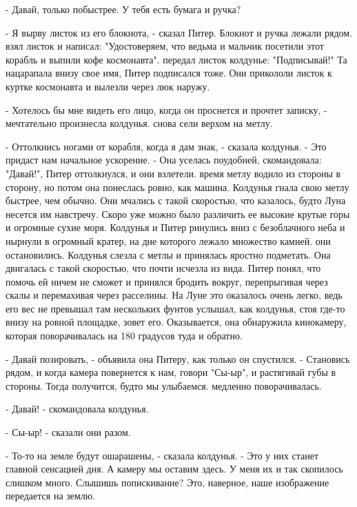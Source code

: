 \par- Давай, только побыстрее. У тебя есть бумага и ручка?
\par- Я вырву листок из его блокнота, - сказал Питер. Блокнот и ручка 
лежали рядом.
 взял листок и написал: "Удостоверяем, что ведьма и мальчик 
посетили этот корабль и выпили кофе космонавта".
 передал листок колдунье: "Подписывай!" Та нацарапала внизу свое 
имя, Питер подписался тоже. Они прикололи листок к куртке космонавта и 
вылезли через люк наружу.
\par- Хотелось бы мне видеть его лицо, когда он проснется и прочтет 
записку, - мечтательно произнесла колдунья.
 снова сели верхом на метлу.
\par- Оттолкнись ногами от корабля, когда я дам знак, - сказала 
колдунья. - Это придаст нам начальное ускорение. - Она уселась 
поудобней, скомандовала: "Давай!", Питер оттолкнулся, и они взлетели.
 время метлу водило из стороны в сторону, но потом она 
понеслась ровно, как машина. Колдунья гнала свою метлу быстрее, чем 
обычно. Они мчались с такой скоростью, что казалось, будто Луна 
несется им навстречу. Скоро уже можно было различить ее высокие крутые 
горы и огромные сухие моря. Колдунья и Питер ринулись вниз с 
безоблачного неба и нырнули в огромный кратер, на дне которого лежало 
множество камней.
 они остановились. Колдунья слезла с метлы и принялась яростно 
подметать. Она двигалась с такой скоростью, что почти исчезла из вида. 
Питер понял, что помочь ей ничем не сможет и принялся бродить вокруг, 
перепрыгивая через скалы и перемахивая через расселины. На Луне это 
оказалось очень легко, ведь его вес не превышал там нескольких фунтов
 услышал, как колдунья, стоя где-то внизу на ровной площадке, 
зовет его. Оказывается, она обнаружила кинокамеру, которая 
поворачивалась на 180 градусов туда и обратно.
\par- Давай позировать, - объявила она Питеру, как только он 
спустился. - Становись рядом, и когда камера повернется к нам, говори 
"Сы-ыр", и растягивай губы в стороны. Тогда получится, будто мы 
улыбаемся.
 медленно поворачивалась.
\par- Давай! - скомандовала колдунья.
\par- Сы-ыр! - сказали они разом.
\par- То-то на земле будут ошарашены, - сказала колдунья. - Это у них 
станет главной сенсацией дня. А камеру мы оставим здесь. У меня их и 
так скопилось слишком много. Слышишь попискивание? Это, наверное, наше 
изображение передается на землю.
